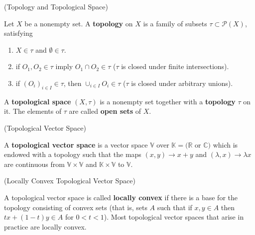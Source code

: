 \begin{definition}{(Topology and Topological Space) \cite{royden1988real}}

Let $X$ be a nonempty set. A \textbf{topology} on $X$ is a family of subsets $\tau \subset \mathcal{P}(X)$, satisfying
    
\begin{enumerate}[label=(\roman*)]
    \item $X \in \tau$ and $\emptyset \in \tau$.
    
    \item if $O_{1}, O_{2} \in \tau$ imply $O_{1} \cap O_{2} \in \tau$ ($\tau$ is closed under finite intersections).
    
    \item if $(O_{i})_{i \in I} \in \tau$, then $\cup_{i \in I}O_{i} \in \tau$ ($\tau$ is closed under arbitrary unions).
    
\end{enumerate}

\vspace{0.05in}

\noindent A \textbf{topological space} $(X, \tau)$ is a nonempty set together with a \textbf{topology} $\tau$ on it. The elements of $\tau$ are called \textbf{open sets} of $X$. 

\end{definition}
\vspace{0.1in}

\begin{definition}{(Topological Vector Space) \cite{folland2013real}}

A \textbf{topological vector space} is a vector space $\mathbb{V}$ over $\mathbb{K} = (\mathbb{R}$ or $\mathbb{C})$ which is endowed with a topology such that the maps $(x,y) \rightarrow x + y$ and $(\lambda,x) \rightarrow \lambda x$ are continuous from $\mathbb{V} \times \mathbb{V}$ and $\mathbb{K} \times \mathbb{V}$ to $\mathbb{V}$.

\end{definition}
\vspace{0.1in}

\begin{definition}{(Locally Convex Topological Vector Space) \cite{folland2013real}}

A topological vector space is called \textbf{locally convex} if there is a base for the topology consisting of convex sets (that is, sets $A$ such that if $x,y \in A$ then $tx + (1-t)y \in A$ for $0 < t < 1$). Most topological vector spaces that arise in practice are locally convex.

\end{definition}
\vspace{0.1in}

